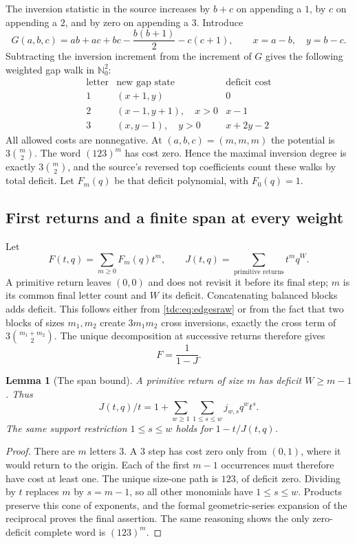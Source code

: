 \documentclass[11pt]{article}
\newtheorem{lemma}[theorem]{Lemma}
\theoremstyle{definition}\newtheorem{definition}[theorem]{Definition}
\theoremstyle{remark}\newtheorem{remark}[theorem]{Remark}
\newcommand{\NN}{\mathbb N_0}
\begin{document}
The inversion statistic in the source increases by $b+c$ on appending a $1$, by $c$ on appending a $2$, and by zero on appending a $3$. Introduce
\[
 G(a,b,c)=ab+ac+bc-\frac{b(b+1)}2-c(c+1),\qquad
 x=a-b,\quad y=b-c.
\]
Subtracting the inversion increment from the increment of $G$ gives the following weighted gap walk in $\NN^2$:
\begin{equation}\label{tdc:eq:edgesraw}
\begin{array}{c|c|c}
 \text{letter}&\text{new gap state}&\text{deficit cost}\\ \hline
 1&(x+1,y)&0\\
 2&(x-1,y+1),\quad x>0&x-1\\
 3&(x,y-1),\quad y>0&x+2y-2
\end{array}
\end{equation}
All allowed costs are nonnegative. At $(a,b,c)=(m,m,m)$ the potential is $3\binom m2$. The word $(123)^m$ has cost zero. Hence the maximal inversion degree is exactly $3\binom m2$, and the source's reversed top coefficients count these walks by total deficit. Let $F_m(q)$ be that deficit polynomial, with $F_0(q)=1$.

\subsection{First returns and a finite span at every weight}
Let
\[
 F(t,q)=\sum_{m\ge0}F_m(q)t^m,\qquad
 J(t,q)=\sum_{\text{primitive returns}}t^m q^W.
\]
A primitive return leaves $(0,0)$ and does not revisit it before its final step; $m$ is its common final letter count and $W$ its deficit. Concatenating balanced blocks adds deficit. This follows either from \eqref{tdc:eq:edgesraw} or from the fact that two blocks of sizes $m_1,m_2$ create $3m_1m_2$ cross inversions, exactly the cross term of $3\binom{m_1+m_2}2$. The unique decomposition at successive returns therefore gives
\begin{equation}\label{tdc:eq:renewal}
 F=\frac1{1-J}.
\end{equation}

\begin{lemma}[The span bound]\label{tdc:lem:span}
A primitive return of size $m$ has deficit $W\ge m-1$. Thus
\[
 J(t,q)/t=1+\sum_{w\ge1}\sum_{1\le s\le w}j_{w,s}q^w t^s.
\]
The same support restriction $1\le s\le w$ holds for $1-t/J(t,q)$.
\end{lemma}
\begin{proof}
There are $m$ letters $3$. A $3$ step has cost zero only from $(0,1)$, where it would return to the origin. Each of the first $m-1$ occurrences must therefore have cost at least one. The unique size-one path is $123$, of deficit zero. Dividing by $t$ replaces $m$ by $s=m-1$, so all other monomials have $1\le s\le w$. Products preserve this cone of exponents, and the formal geometric-series expansion of the reciprocal proves the final assertion. The same reasoning shows the only zero-deficit complete word is $(123)^m$.
\end{proof}
\end{document}
